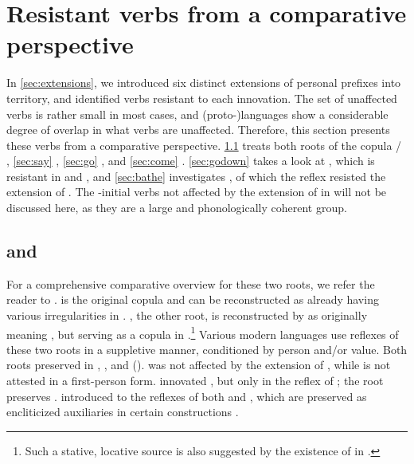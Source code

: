 \section{Resistant verbs from a comparative perspective}
\label{sec:verbs}
In \cref{sec:extensions}, we introduced six distinct extensions of personal prefixes into  territory, and identified verbs resistant to each innovation.
The set of unaffected verbs is rather small in most cases, and (proto-)languages show a considerable degree of overlap in what verbs are unaffected.
Therefore, this section presents these verbs from a comparative perspective.
\cref{sec:be} treats both roots of the copula / , \cref{sec:say}  , \cref{sec:go}  , and \cref{sec:come}  .
\cref{sec:godown} takes a look at  , which is resistant in \PTir and \PPek, and  \cref{sec:bathe} investigates  , of which the \PPek reflex  resisted the extension of .
The -initial verbs not affected by the extension of  in \akuriyo {} will not be discussed here, as they are a large and phonologically coherent group.

\subsection{ and  }
\label{sec:be}
For a comprehensive comparative overview for these two roots, we refer the reader to \textcite[375--382]{gildea2018reconstructing}.
 is the original copula and can be reconstructed as already having various irregularities in \PC.
, the other root, is reconstructed by \textcites{meira2009property}{gildea2018reconstructing} as originally meaning , but serving as a copula in \PC.\footnote{Such a stative, locative source is also suggested by the existence of   in \arara \parencite[196]{alves2017arara}.}
Various modern languages use reflexes of these two roots in a suppletive manner, conditioned by person and\slash{}or  value.
Both roots preserved   in \PPek, \PWai, and \PTir ().
\akuriyo {} was not affected by the extension of  , while  is not attested in a first-person form. 
\carijo innovated , but only in the reflex of  ; the  root preserves  .
\yukpa introduced  to the reflexes of both  and , which are preserved as encliticized auxiliaries in certain constructions .

